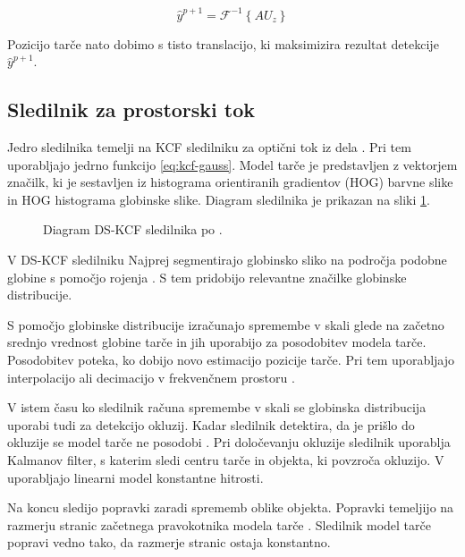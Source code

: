 \begin{equation}
\hat{y}^{p + 1} = \mathcal{F}^{-1}\left\{ A U_z \right\}
\label{eq:detection-score}
\end{equation}

Pozicijo tarče nato dobimo s tisto translacijo, ki maksimizira rezultat detekcije $\hat{y}^{p+1}$.












\subsection{Sledilnik za prostorski tok}
Jedro sledilnika temelji na KCF sledilniku za optični tok iz dela \cite{henriques2015high}. Pri tem uporabljajo jedrno funkcijo \eqref{eq:kcf-gauss}. Model tarče je predstavljen z vektorjem značilk, ki je sestavljen iz histograma orientiranih gradientov (HOG) barvne slike in HOG histograma globinske slike. Diagram sledilnika je prikazan na sliki \ref{fig:diagram-dskcf}.

\begin{figure}[htb]
	\centering
	
	\caption{Diagram DS-KCF sledilnika po \cite{hannuna2016ds}.}
	\label{fig:diagram-dskcf}
\end{figure}

V DS-KCF sledilniku Najprej segmentirajo globinsko sliko na področja podobne globine s pomočjo rojenja \cite{hannuna2016ds}. S tem pridobijo relevantne značilke globinske distribucije. 

S pomočjo globinske distribucije izračunajo spremembe v skali glede na začetno srednjo vrednost globine tarče in jih uporabijo za posodobitev modela tarče. Posodobitev poteka, ko dobijo novo estimacijo pozicije tarče. Pri tem uporabljajo interpolacijo ali decimacijo v frekvenčnem prostoru \cite{hannuna2016ds}.

V istem času ko sledilnik računa spremembe v skali se globinska distribucija uporabi tudi za detekcijo okluzij. Kadar sledilnik detektira, da je prišlo do okluzije se model tarče ne posodobi \cite{hannuna2016ds}. Pri določevanju okluzije sledilnik uporablja Kalmanov filter, s katerim sledi centru tarče in objekta, ki povzroča okluzijo. V \cite{hannuna2016ds} uporabljajo linearni model konstantne hitrosti.  

Na koncu sledijo popravki zaradi sprememb oblike objekta. Popravki temeljijo na razmerju stranic začetnega pravokotnika modela tarče \cite{hannuna2016ds}. Sledilnik model tarče popravi vedno tako, da razmerje stranic ostaja konstantno.





